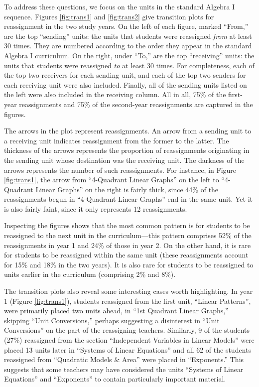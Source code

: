 \documentclass[12pt]{article}\usepackage[]{graphicx}\usepackage[]{color}
\begin{document}
To address these questions, we focus on the units in the standard
Algebra I sequence.
Figures \ref{fig:trans1} and \ref{fig:trans2} give transition plots
for reassignment in the two study years.
On the left of each figure, marked ``From,'' are the top ``sending''
units: the units that students were reassigned \emph{from} at least 30
times.
They are numbered according to the order they appear in the standard Algebra I curriculum.
On the right, under ``To,'' are the top ``receiving'' units: the units
that students were reassigned \emph{to} at least 30 times.
For completeness, each of the top two receivers for each sending unit,
and each of the top two senders for each receiving unit were also included.
Finally, all of the sending units listed on the left were also included in the
receiving column.
All in all, 75\% of the first-year reassignments and
75\% of the second-year reassignments are
captured in the figures.

The arrows in the plot represent reassignments.
An arrow from a sending unit to a receiving unit indicates
reassignment from the former to the latter.
The thickness of the arrows represents the proportion of reassignments
originating in the sending unit whose destination was the receiving unit.
The darkness of the arrows represents the number of such reassignments.
For instance, in Figure \ref{fig:trans1}, the arrow from
``4-Quadrant Linear Graphs'' on the left to ``4-Quadrant Linear
Graphs'' on the right is fairly thick, since
44\%
of the reassignments begun in ``4-Quadrant Linear Graphs'' end in the
same unit.
Yet it is also fairly faint, since it only represents
12
reassignments.

Inspecting the figures shows that the most common pattern is for
students to be reassigned to the next unit in the curriculum---this pattern comprises
52\% of the reassignments in year 1 and
24\% of those in
year 2.
On the other hand, it is rare for students to be reassigned within the same unit
(these reassignments account for 15\% and 18\% in the two years).
It is also rare for students to be reassigned to units earlier in the curriculum (comprising
2\% and
8\%).

The transition plots also reveal some interesting cases worth highlighting.
In year 1 (Figure \ref{fig:trans1}), students reassigned from the first unit, ``Linear Patterns'', were primarily placed two units ahead, in ``1st Quadrant Linear Graphs,'' skipping ``Unit Conversions,'' perhaps suggesting a disinterest in ``Unit Conversions'' on the part of the reassigning teachers.
Similarly,
9
of the students
(27\%)
reassigned from the section ``Independent Variables in Linear Models'' were placed 13 units later in ``Systems of Linear Equations''
and all 62 of the students reassigned from ``Quadratic Models \& Area'' were placed in ``Exponents.''
This suggests that some teachers may have considered the units ``Systems of Linear Equations'' and ``Exponents'' to contain particularly important material.
\end{document}
